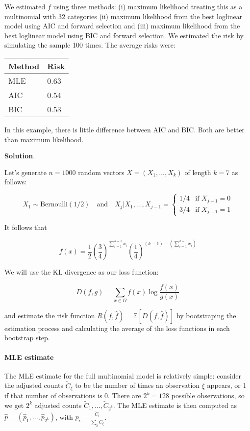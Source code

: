 We estimated \(f\) using three methods: (i) maximum likelihood treating
this as a multinomial with 32 categories (ii) maximum likelihood from
the best loglinear model using AIC and forward selection and (iii)
maximum likelihood from the best loglinear model using BIC and forward
selection. We estimated the risk by simulating the sample 100 times. The
average risks were:

\begin{longtable}[]{@{}ll@{}}
\toprule
Method & Risk \\
\midrule
\endhead
MLE & 0.63 \\
AIC & 0.54 \\
BIC & 0.53 \\
\bottomrule
\end{longtable}

In this example, there is little difference between AIC and BIC. Both
are better than maximum likelihood.

\textbf{Solution}.

Let's generate \(n = 1000\) random vectors \(X = (X_1, \dots, X_k)\) of
length \(k = 7\) as follows:

\[ X_1 \sim \text{Bernoulli}(1/2) 
\quad \text{and} \quad
X_j | X_1, \dots, X_{j-1} = \begin{cases}
1/4 & \text{if } X_{j-1} = 0 \\
3/4 & \text{if } X_{j-1} = 1
\end{cases}
\]

It follows that

\[ f(x) = \frac{1}{2} \left( \frac{3}{4} \right)^{\sum_{i=1}^{k - 1} x_i} \left( \frac{1}{4} \right)^{(k - 1) - \left(\sum_{i=1}^{k - 1} x_i \right)} \]

We will use the KL divergence as our loss function:

\[ D(f, g) = \sum_{x \in \Omega} f(x) \log \frac{f(x)}{g(x)} \]

and estimate the risk function
\(R(f, \hat{f}) = \mathbb{E}[D(f, \hat{f})]\) by bootstraping the
estimation process and calculating the average of the loss functions in
each bootstrap step.

\paragraph{MLE estimate}\label{mle-estimate}

The MLE estimate for the full multinomial model is relatively simple:
consider the adjusted counts \(\tilde{C}_{\xi}\) to be the number of
times an observation \(\xi\) appears, or 1 if that number of
observations is 0. There are \(2^k = 128\) possible observations, so we
get \(2^k\) adjusted counts \(\tilde{C}_1, \dots, \tilde{C}_{2^k}\). The
MLE estimate is then computed as
\(\hat{p} = (\hat{p}_1, \dots, \hat{p}_{2^k})\), with
\(\hat{p}_i = \frac{\tilde{C}_i}{\sum_\xi \tilde{C}_\xi}\).

